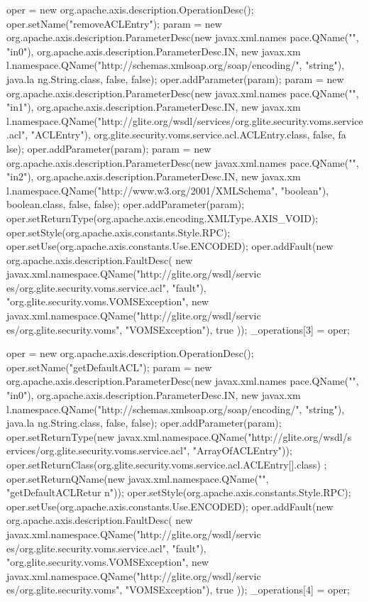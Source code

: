 \begin{DoxyCode}
{        oper = new org.apache.axis.description.OperationDesc();
        oper.setName("removeACLEntry");
        param = new org.apache.axis.description.ParameterDesc(new javax.xml.names
      pace.QName("", "in0"), org.apache.axis.description.ParameterDesc.IN, new javax.xm
      l.namespace.QName("http://schemas.xmlsoap.org/soap/encoding/", "string"), java.la
      ng.String.class, false, false);
        oper.addParameter(param);
        param = new org.apache.axis.description.ParameterDesc(new javax.xml.names
      pace.QName("", "in1"), org.apache.axis.description.ParameterDesc.IN, new javax.xm
      l.namespace.QName("http://glite.org/wsdl/services/org.glite.security.voms.service
      .acl", "ACLEntry"), org.glite.security.voms.service.acl.ACLEntry.class, false, fa
      lse);
        oper.addParameter(param);
        param = new org.apache.axis.description.ParameterDesc(new javax.xml.names
      pace.QName("", "in2"), org.apache.axis.description.ParameterDesc.IN, new javax.xm
      l.namespace.QName("http://www.w3.org/2001/XMLSchema", "boolean"), boolean.class, 
      false, false);
        oper.addParameter(param);
        oper.setReturnType(org.apache.axis.encoding.XMLType.AXIS_VOID);
        oper.setStyle(org.apache.axis.constants.Style.RPC);
        oper.setUse(org.apache.axis.constants.Use.ENCODED);
        oper.addFault(new org.apache.axis.description.FaultDesc(
                      new javax.xml.namespace.QName("http://glite.org/wsdl/servic
      es/org.glite.security.voms.service.acl", "fault"),
                      "org.glite.security.voms.VOMSException",
                      new javax.xml.namespace.QName("http://glite.org/wsdl/servic
      es/org.glite.security.voms", "VOMSException"), 
                      true
                     ));
        _operations[3] = oper;

        oper = new org.apache.axis.description.OperationDesc();
        oper.setName("getDefaultACL");
        param = new org.apache.axis.description.ParameterDesc(new javax.xml.names
      pace.QName("", "in0"), org.apache.axis.description.ParameterDesc.IN, new javax.xm
      l.namespace.QName("http://schemas.xmlsoap.org/soap/encoding/", "string"), java.la
      ng.String.class, false, false);
        oper.addParameter(param);
        oper.setReturnType(new javax.xml.namespace.QName("http://glite.org/wsdl/s
      ervices/org.glite.security.voms.service.acl", "ArrayOfACLEntry"));
        oper.setReturnClass(org.glite.security.voms.service.acl.ACLEntry[].class)
      ;
        oper.setReturnQName(new javax.xml.namespace.QName("", "getDefaultACLRetur
      n"));
        oper.setStyle(org.apache.axis.constants.Style.RPC);
        oper.setUse(org.apache.axis.constants.Use.ENCODED);
        oper.addFault(new org.apache.axis.description.FaultDesc(
                      new javax.xml.namespace.QName("http://glite.org/wsdl/servic
      es/org.glite.security.voms.service.acl", "fault"),
                      "org.glite.security.voms.VOMSException",
                      new javax.xml.namespace.QName("http://glite.org/wsdl/servic
      es/org.glite.security.voms", "VOMSException"), 
                      true
                     ));
        _operations[4] = oper;

}
\end{DoxyCode}
